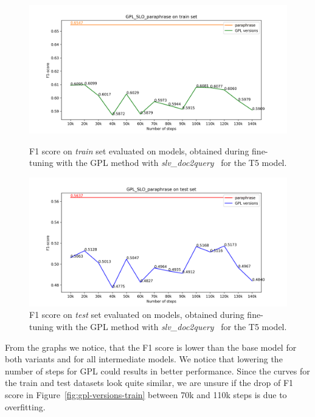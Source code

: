\documentclass[fleqn,moreauthors,10pt]{ds_report}
\begin{document}
\begin{figure}
    \centering
    \begin{minipage}{0.5\textwidth}
        \centering
        \includegraphics[width=\linewidth]{GPL_SLO__paraphrase_train.png}
        \caption{F1 score on \textit{train} set evaluated on models, obtained during fine-tuning with the GPL method with {\it slv\_doc2query}~\cite{boshko} for the T5 model.}
		\label{fig:gpl-slo-versions-train}
    \end{minipage}\hfill
    \begin{minipage}{0.5\textwidth}
        \centering
        \includegraphics[width=\linewidth]{GPL_SLO__paraphrase_test.png}
        \caption{F1 score on \textit{test} set evaluated on models, obtained during fine-tuning with the GPL method with {\it slv\_doc2query}~\cite{boshko} for the T5 model.}
		\label{fig:gpl-slo-versions}
    \end{minipage}
\end{figure}


From the graphs we notice, that the F1 score is lower than the base model for both variants and for all intermediate models. We notice that lowering the number of steps for GPL could results in better performance. Since the curves for the train and test datasets look quite similar, we are unsure if the drop of F1 score in Figure~\ref{fig:gpl-versions-train} between 70k and 110k steps is due to overfitting.
\end{document}
